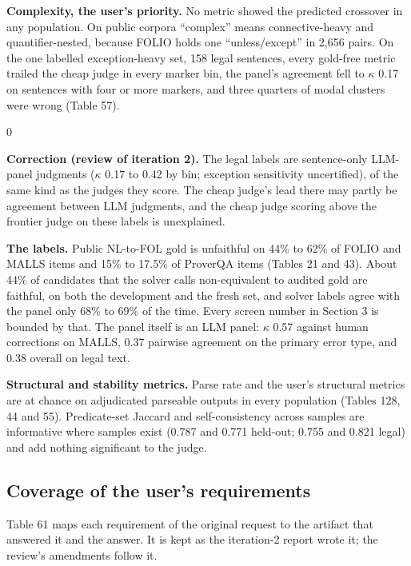 \documentclass[11pt,letterpaper]{article}
\newenvironment{correction}{\par\medskip\noindent\begin{minipage}{\linewidth}\setlength{\fboxsep}{6pt}\begin{lrbox}{0}\begin{minipage}{0.96\linewidth}\small}{\end{minipage}\end{lrbox}\colorbox{black!6}{\usebox{0}}\end{minipage}\par\medskip}
\begin{document}
\textbf{Complexity, the user's priority.} No metric showed the predicted crossover in any population. On public corpora ``complex'' means connective-heavy and quantifier-nested, because FOLIO holds one ``unless/except'' in 2,656 pairs. On the one labelled exception-heavy set, 158 legal sentences, every gold-free metric trailed the cheap judge in every marker bin, the panel's agreement fell to $\kappa$ 0.17 on sentences with four or more markers, and three quarters of modal clusters were wrong (Table 57).

\begin{correction}\textbf{Correction (review of iteration 2).} The legal labels are sentence-only LLM-panel judgments ($\kappa$ 0.17 to 0.42 by bin; exception sensitivity uncertified), of the same kind as the judges they score. The cheap judge's lead there may partly be agreement between LLM judgments, and the cheap judge scoring above the frontier judge on these labels is unexplained.\end{correction}

\textbf{The labels.} Public NL-to-FOL gold is unfaithful on 44\% to 62\% of FOLIO and MALLS items and 15\% to 17.5\% of ProverQA items (Tables 21 and 43). About 44\% of candidates that the solver calls non-equivalent to audited gold are faithful, on both the development and the fresh set, and solver labels agree with the panel only 68\% to 69\% of the time. Every screen number in Section 3 is bounded by that. The panel itself is an LLM panel: $\kappa$ 0.57 against human corrections on MALLS, 0.37 pairwise agreement on the primary error type, and 0.38 overall on legal text.

\textbf{Structural and stability metrics.} Parse rate and the user's structural metrics are at chance on adjudicated parseable outputs in every population (Tables 128, 44 and 55). Predicate-set Jaccard and self-consistency across samples are informative where samples exist (0.787 and 0.771 held-out; 0.755 and 0.821 legal) and add nothing significant to the judge.

\subsection{Coverage of the user's requirements}

Table 61 maps each requirement of the original request to the artifact that answered it and the answer. It is kept as the iteration-2 report wrote it; the review's amendments follow it.
\end{document}
